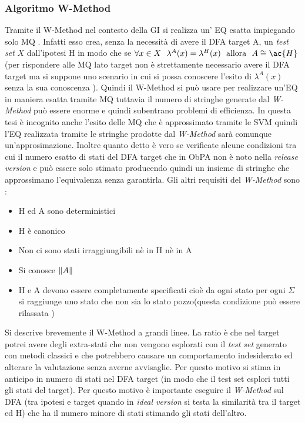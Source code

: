 \subsubsection{Algoritmo W-Method}

Tramite il W-Method nel contesto della \ac{GI} si realizza un' \ac{EQ} esatta impiegando solo \ac{MQ} \cite{Balanescu03}. Infatti esso crea, senza la necessità di avere il \ac{DFA} target A,  un \textit{test set}  $X$ dall'ipotesi \ac{H} in modo che se $\forall x \in X \:\:\: \lambda^{A}(x) = \lambda^{H}(x) \:\:\: \text{allora} \:\:\: A \cong \ac{H}$  (per rispondere alle \ac{MQ} lato target non è strettamente necessario avere il \ac{DFA} target ma si suppone uno scenario in cui si possa conoscere l'esito di $\lambda^{A}(x)$ senza la sua conoscenza ). Quindi il W-Method si può usare per realizzare un'\ac{EQ} in maniera esatta tramite \ac{MQ} tuttavia il numero di stringhe generate dal \textit{W-Method} può essere enorme e quindi subentrano problemi di efficienza. In questa tesi è incognito anche l'esito delle \ac{MQ} che è approssimato tramite le \ac{SVM} quindi l'\ac{EQ} realizzata tramite le stringhe prodotte dal \textit{W-Method} sarà comunque un'approsimazione. Inoltre quanto detto è vero se verificate alcune condizioni tra cui il numero esatto di stati del \ac{DFA} target   che in \ac{ObPA} non è noto nella \textit{release version} e può essere solo stimato producendo quindi un insieme di stringhe che approssimano l'equivalenza senza garantirla. Gli altri requisiti del \textit{W-Method} sono \cite{Balanescu03}:
\begin{itemize}
\item \ac{H} ed A sono deterministici
\item \ac{H} è canonico
\item Non ci sono stati irraggiungibili nè in \ac{H} nè in A
\item Si conosce $\lVert A\rVert$
\item \ac{H} e A devono essere completamente specificati cioè da ogni stato per ogni $\Sigma$ si raggiunge uno stato che non sia lo stato pozzo(questa condizione può essere rilassata \cite{Balanescu03})
\end{itemize}
Si descrive brevemente il W-Method a grandi linee.   La ratio è che nel target potrei avere degli extra-stati che non vengono esplorati con il \textit{test set} generato con metodi classici e che potrebbero causare un comportamento indesiderato ed alterare la valutazione senza averne avvisaglie. Per questo motivo si stima in anticipo in numero di stati nel \ac{DFA} target (in modo che il test set esplori tutti gli stati del target). Per questo motivo è importante eseguire il \textit{W-Method} sul \ac{DFA} (tra ipotesi e target quando in \textit{ideal version} si testa la similarità tra il target ed \ac{H}) che ha il numero minore di stati stimando gli stati dell'altro.\\
